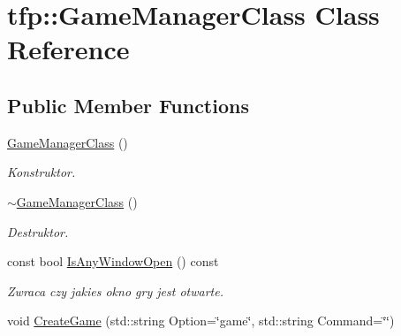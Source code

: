 \hypertarget{classtfp_1_1_game_manager_class}{}\section{tfp\+:\+:Game\+Manager\+Class Class Reference}
\label{classtfp_1_1_game_manager_class}
\subsection*{Public Member Functions}
\begin{DoxyCompactItemize}
\item 
\mbox{\label{classtfp_1_1_game_manager_class_a50390d0e19c105ac7f4afc1c37b57311}} 
\mbox{\hyperlink{classtfp_1_1_game_manager_class_a50390d0e19c105ac7f4afc1c37b57311}{Game\+Manager\+Class}} ()
\begin{DoxyCompactList}\small\item\em Konstruktor. \end{DoxyCompactList}\item 
\mbox{\label{classtfp_1_1_game_manager_class_ae5e17ee81f5369c6fc1f3516a726321a}} 
\mbox{\hyperlink{classtfp_1_1_game_manager_class_ae5e17ee81f5369c6fc1f3516a726321a}{$\sim$\+Game\+Manager\+Class}} ()
\begin{DoxyCompactList}\small\item\em Destruktor. \end{DoxyCompactList}\item 
\mbox{\label{classtfp_1_1_game_manager_class_a8ac02490731b416cea638750bfc81672}} 
const bool \mbox{\hyperlink{classtfp_1_1_game_manager_class_a8ac02490731b416cea638750bfc81672}{Is\+Any\+Window\+Open}} () const
\begin{DoxyCompactList}\small\item\em Zwraca czy jakies okno gry jest otwarte. \end{DoxyCompactList}\item 
\mbox{\label{classtfp_1_1_game_manager_class_a552a2c6c23c8d17b4aa998bef585ce31}} 
void \mbox{\hyperlink{classtfp_1_1_game_manager_class_a552a2c6c23c8d17b4aa998bef585ce31}{Create\+Game}} (std\+::string Option=\char`\"{}game\char`\"{}, std\+::string Command=\char`\"{}\char`\"{})

\end{DoxyCompactItemize}
